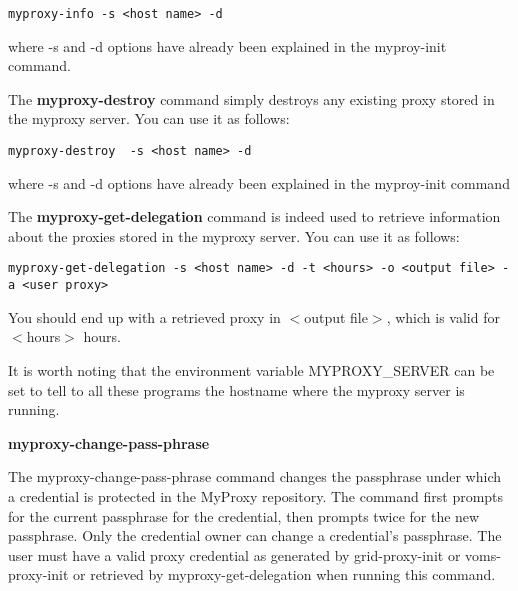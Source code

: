 \smallskip
{\scriptsize{\verb!myproxy-info -s <host name> -d!}}
\smallskip

where -s and -d options have already been explained in the myproy-init command.

\medskip
The {\bf myproxy-destroy} command simply destroys any existing proxy stored in the myproxy server. 
You can use it as follows:

\smallskip
{\scriptsize{\verb!myproxy-destroy  -s <host name> -d!}}
\smallskip

where -s and -d options have already been explained in the myproy-init command

\medskip
The {\bf myproxy-get-delegation} command is indeed used to retrieve information about the proxies 
stored in the myproxy server. You can use it as follows:

\smallskip
{\scriptsize{\verb!myproxy-get-delegation -s <host name> -d -t <hours> -o <output file> -a <user proxy>!}}
\smallskip

You should end up with a retrieved proxy in $<$output file$>$, which is valid for
$<$hours$>$ hours.

It is worth noting that the environment variable MYPROXY\-\_SERVER can be set to tell to all these 
programs the hostname where the myproxy server is running.

\medskip
{\bf myproxy-change-pass-phrase}  

The  myproxy-change-pass-phrase  command  changes  the passphrase under which a credential is protected 
in the MyProxy repository.  The command first prompts for  the  current  passphrase  for the credential, 
then prompts twice for the new passphrase.  Only the  credential  owner  can change  a  credential's 
passphrase. 
The user must have a valid proxy credential as generated by grid-proxy-init or voms-proxy-init or retrieved 
by myproxy-get-delegation when running this command.
   
